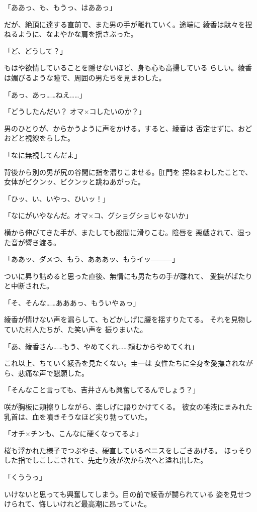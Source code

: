 ﻿\documentclass[
    book,tate,
    line_length=30zw,
    jafontsize=12pt,
    paper=b5j,
    landscape,
    ]{jlreq}
\begin{document}
「ああっ、も、もうっ、はああっ」

だが、絶頂に達する直前で、また男の手が離れていく。途端に
綾香は駄々を捏ねるように、なよやかな肩を揺さぶった。

「ど、どうして？」

もはや欲情していることを隠せないほど、身も心も高揚している
らしい。綾香は媚びるような瞳で、周囲の男たちを見まわした。

「あっ、あっ……ねえ……」

「どうしたんだい？ オマ×コしたいのか？」

男のひとりが、からかうように声をかける。すると、綾香は
否定せずに、おどおどと視線をらした。

「なに無視してんだよ」

背後から別の男が尻の谷間に指を潜りこませる。肛門を
捏ねまわしたことで、女体がビクンッ、ビクンッと跳ねあがった。

「ひッ、い、いやっ、ひいッ！」

「なにがいやなんだ。オマ×コ、グショグショじゃないか」

横から伸びてきた手が、またしても股間に滑りこむ。陰唇を
悪戯されて、湿った音が響き渡る。

「ああッ、ダメつ、もう、あああッ、もうイッ―――」

ついに昇り詰めると思った直後、無情にも男たちの手が離れて、
愛撫がぱたりと中断された。

「そ、そんな……あああっ、もういやぁっ」

綾香が情けない声を漏らして、もどかしげに腰を揺すりたてる。
それを見物していた村人たちが、た笑い声を
振りまいた。

「あ、綾香さん……もう、やめてくれ……頼むからやめてくれ」

これ以上、ちていく綾香を見たくない。圭一は
女性たちに全身を愛撫されながら、悲痛な声で懇願した。

「そんなこと言っても、吉井さんも興奮してるんでしょう？」

咲が胸板に頬擦りしながら、楽しげに語りかけてくる。 
彼女の唾液にまみれた乳首は、血を噴きそうなほど尖り勃っていた。

「オチ×チンも、こんなに硬くなってるよ」

桜も浮かれた様子でつぶやき、硬直しているペニスをしごきあげる。
ほっそりした指でしこしこされて、先走り液が次から次へと溢れ出した。

「くううっ」

いけないと思っても興奮してしまう。目の前で綾香が嬲られている
姿を見せつけられて、悔しいけれど最高潮に昂っていた。
\end{document}
